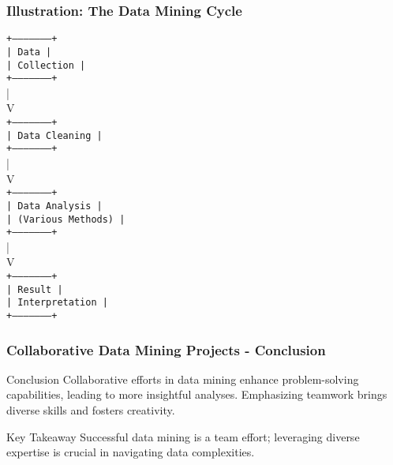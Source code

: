 \documentclass[aspectratio=169]{beamer}
\begin{document}
\begin{frame}[fragile]
    \frametitle{Illustration: The Data Mining Cycle}
    \begin{center}
        \texttt{+---------------------+} \\
        \texttt{|      Data         |} \\
        \texttt{|    Collection      |} \\
        \texttt{+---------------------+} \\
               | \\
               V \\
        \texttt{+---------------------+} \\
        \texttt{|    Data Cleaning    |} \\
        \texttt{+---------------------+} \\
               | \\
               V \\
        \texttt{+---------------------+} \\
        \texttt{|   Data Analysis     |} \\
        \texttt{| (Various Methods)  |} \\
        \texttt{+---------------------+} \\
               | \\
               V \\               
        \texttt{+---------------------+} \\
        \texttt{|   Result           |} \\
        \texttt{|   Interpretation   |} \\
        \texttt{+---------------------+}
    \end{center}
\end{frame}

\begin{frame}[fragile]
    \frametitle{Collaborative Data Mining Projects - Conclusion}
    \begin{block}{Conclusion}
        Collaborative efforts in data mining enhance problem-solving capabilities, leading to more insightful analyses. Emphasizing teamwork brings diverse skills and fosters creativity.
    \end{block}
    \begin{block}{Key Takeaway}
        Successful data mining is a team effort; leveraging diverse expertise is crucial in navigating data complexities.
    \end{block}
\end{frame}
\end{document}
